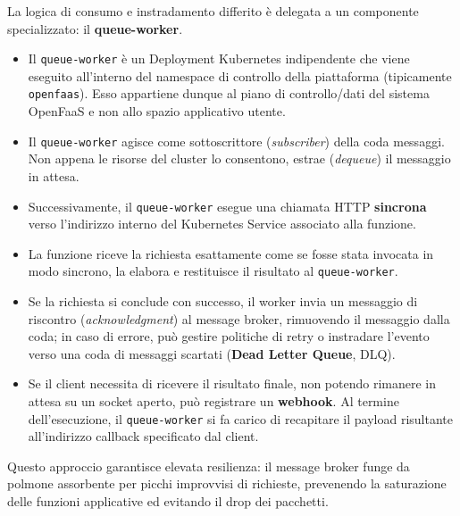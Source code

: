 \documentclass[11pt, a4paper]{article}
\begin{document}

La logica di consumo e instradamento differito è delegata a un componente specializzato: il \textbf{queue-worker}.
\begin{itemize}
    \item Il \texttt{queue-worker} è un Deployment Kubernetes indipendente che viene eseguito all'interno del namespace di controllo della piattaforma (tipicamente \texttt{openfaas}). Esso appartiene dunque al piano di controllo/dati del sistema OpenFaaS e non allo spazio applicativo utente.
    \item Il \texttt{queue-worker} agisce come sottoscrittore (\emph{subscriber}) della coda messaggi. Non appena le risorse del cluster lo consentono, estrae (\emph{dequeue}) il messaggio in attesa.
    \item Successivamente, il \texttt{queue-worker} esegue una chiamata HTTP \textbf{sincrona} verso l'indirizzo interno del Kubernetes Service associato alla funzione.
    \item La funzione riceve la richiesta esattamente come se fosse stata invocata in modo sincrono, la elabora e restituisce il risultato al \texttt{queue-worker}.
    \item Se la richiesta si conclude con successo, il worker invia un messaggio di riscontro (\emph{acknowledgment}) al message broker, rimuovendo il messaggio dalla coda; in caso di errore, può gestire politiche di retry o instradare l'evento verso una coda di messaggi scartati (\textbf{Dead Letter Queue}, DLQ).
    \item Se il client necessita di ricevere il risultato finale, non potendo rimanere in attesa su un socket aperto, può registrare un \textbf{webhook}. Al termine dell'esecuzione, il \texttt{queue-worker} si fa carico di recapitare il payload risultante all'indirizzo callback specificato dal client.
\end{itemize}

Questo approccio garantisce elevata resilienza: il message broker funge da polmone assorbente per picchi improvvisi di richieste, prevenendo la saturazione delle funzioni applicative ed evitando il drop dei pacchetti.

\newpage

\end{document}
